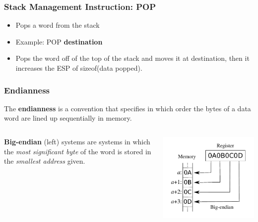 \documentclass[]{beamer}
\begin{document}
\begin{frame}
  \frametitle{Stack Management Instruction: POP}
  \begin{itemize}
  \item{Pops a word from the stack}
  \item{Example: POP {\bf destination} }
  \item{Pops the word off of the top of the stack and moves it at destination, then it increases the ESP of sizeof(data popped).}
  \end{itemize}
\end{frame}


\begin{frame}
  \frametitle{Endianness}
  The \textbf{endianness} is a convention that specifies in which order the bytes of a data word are lined up sequentially in memory.
  \begin{columns}
    \begin{column}{0.72\columnwidth}
      \textbf{Big-endian} (left) systems are systems in which the \emph{most significant byte} of the word is stored in the \emph{smallest address} given.
    \end{column}
    \begin{column}{0.28\columnwidth}
      \includegraphics[width=\textwidth]{images/Big-Endian.pdf}
      \label{Big-Endian}
    \end{column}
  \end{columns}
  \begin{columns}

\end{columns}
\end{frame}
\end{document}
